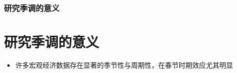 \documentclass{beamer}
\begin{document}
\begin{frame}
\frametitle{研究季调的意义}
\section{研究季调的意义} %
\begin{itemize}
\item 许多宏观经济数据存在显著的季节性与周期性，在春节时期效应尤其明显
\end{itemize}
\begin{figure}
\end{figure}
\end{frame}
\end{document}

